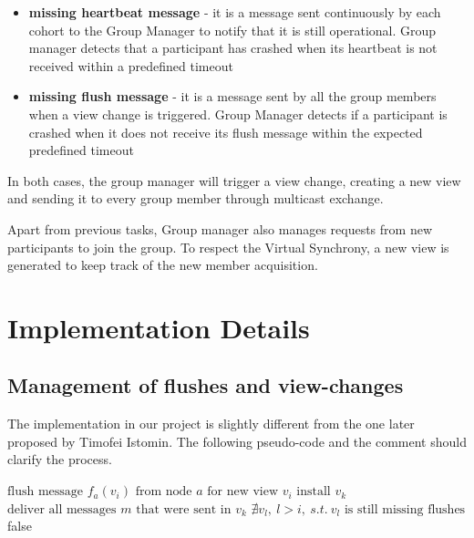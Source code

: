 \documentclass[11pt]{article}
\begin{document}
	\begin{itemize}
		\item \textbf{missing heartbeat message} - it is a message sent continuously by each cohort to the Group Manager to notify that it is still operational. Group manager detects that a participant has crashed when its heartbeat is not received within a predefined timeout
		\item \textbf{missing flush message} - it is a message sent by all the group members when a view change is triggered. Group Manager detects if a participant is crashed when it does not receive its flush message within the expected predefined timeout
	\end{itemize}
	In both cases, the group manager will trigger a view change, creating a new view and sending it to every group member through multicast exchange.
	
	Apart from previous tasks, Group manager also manages requests from new participants to join the group. To respect the Virtual Synchrony, a new view is generated to keep track of the new member acquisition.
	
	
	\section{Implementation Details}
	\label{sec:imp_details}
	\subsection{Management of flushes and view-changes}
	The implementation in our project is slightly different from the one later proposed by Timofei Istomin. The following pseudo-code and the comment should clarify the process.
	
	\begin{algorithm}
	\begin{algorithmic}
		\REQUIRE $\text{flush message }f_{a}(v_{i}) \text{ from node }a\text{ for new view } v_{i} $
				\STATE $ \text{install } v_{k} $
				\STATE $ \text{deliver all messages } m \text{ that were sent in } v_{k} $
			\ENDFOR
			\RETURN $ \nexists v_{l},\ l > i,\ s.t. \ v_{l}\text{ is still missing flushes} $
		\ENDIF
		\RETURN false
	\end{algorithmic}	
	\end{algorithm}	
	
\end{document}

